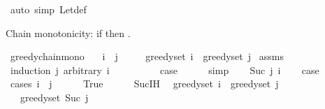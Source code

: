 \begin{isabellebody}
\ {\isacharparenleft}{\kern0pt}auto\ simp{\isacharcolon}{\kern0pt}\ Let{\isacharunderscore}{\kern0pt}def{\isacharparenright}{\kern0pt}\isanewline
{}\isamarkupfalse%
%
\endisatagproof
{\isafoldproof}%
%
\isadelimproof
%
\endisadelimproof
%
\begin{isamarkuptext}%
Chain monotonicity: if  then .%
\end{isamarkuptext}\isamarkuptrue%
\isamarkupfalse%
\ greedy{\isacharunderscore}{\kern0pt}chain{\isacharunderscore}{\kern0pt}mono{\isacharcolon}{\kern0pt}\isanewline
\ \ \ {\isachardoublequoteopen}i\ {\isasymle}\ j{\isachardoublequoteclose}\isanewline
\ \ \ \ \ {\isachardoublequoteopen}greedy{\isacharunderscore}{\kern0pt}set\ i\ {\isasymsubseteq}\ greedy{\isacharunderscore}{\kern0pt}set\ j{\isachardoublequoteclose}\isanewline
%
\isadelimproof
%
\endisadelimproof
%
\isatagproof
{}\isamarkupfalse%
\ assms\isanewline
{}\isamarkupfalse%
\ {\isacharparenleft}{\kern0pt}induction\ j\ arbitrary{\isacharcolon}{\kern0pt}\ i{\isacharparenright}{\kern0pt}\isanewline
\ \ \isamarkupfalse%
\ {}\isanewline
\ \ \isamarkupfalse%
\ \isamarkupfalse%
\ {\isacharquery}{\kern0pt}case\isanewline
\ \ \ \ \isamarkupfalse%
\ simp\isanewline
{}\isamarkupfalse%
\isanewline
\ \ \isamarkupfalse%
\ {\isacharparenleft}{\kern0pt}Suc\ j\ i{\isacharparenright}{\kern0pt}\isanewline
\ \ \isamarkupfalse%
\ {\isacharquery}{\kern0pt}case\isanewline
\ \ \isamarkupfalse%
\ {\isacharparenleft}{\kern0pt}cases\ {\isachardoublequoteopen}i\ {\isasymle}\ j{\isachardoublequoteclose}{\isacharparenright}{\kern0pt}\isanewline
\ \ \ \ \isamarkupfalse%
\ True\isanewline
\ \ \ \ \isamarkupfalse%
\ Suc{\isachardot}{\kern0pt}IH\ \isamarkupfalse%
\ {\isachardoublequoteopen}greedy{\isacharunderscore}{\kern0pt}set\ i\ {\isasymsubseteq}\ greedy{\isacharunderscore}{\kern0pt}set\ j{\isachardoublequoteclose}\ \isakeywordONE{{\isachardot}{\kern0pt}}\isamarkupfalse%
\isanewline
\ \ \ \ \isamarkupfalse%
\ \isamarkupfalse%
\ {\isachardoublequoteopen}{\isachardot}{\kern0pt}{\isachardot}{\kern0pt}{\isachardot}{\kern0pt}\ {\isasymsubseteq}\ greedy{\isacharunderscore}{\kern0pt}set\ {\isacharparenleft}{\kern0pt}Suc\ j{\isacharparenright}{\kern0pt}{\isachardoublequoteclose}\isanewline

\end{isabellebody}
